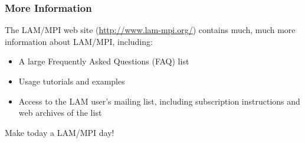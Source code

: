 \subsubsection{More Information}

The LAM/MPI web site (\url{http://www.lam-mpi.org/}) contains much,
much more information about LAM/MPI, including:

\begin{itemize}
\item A large Frequently Asked Questions (FAQ) list
\item Usage tutorials and examples
\item Access to the LAM user's mailing list, including subscription
  instructions and web archives of the list
\end{itemize}

\noindent Make today a LAM/MPI day!


